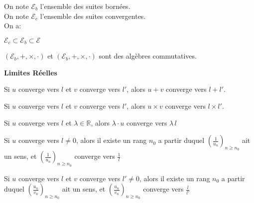 \documentclass[12pt,twoside,a4paper]{article}
\begin{document}
		\begin{prop}
			On note $\mathcal{E}_b$ l'ensemble des suites bornées.\\
			On note $\mathcal{E}_c$ l'ensemble des suites convergentes.\\
			On a:
			\begin{liste}
				\item$\mathcal{E}_c\subset\mathcal{E}_b\subset\mathcal{E}$
				\item$(\mathcal{E}_b,+,\times,\cdot)$ et $(\mathcal{E}_b,+,\times,\cdot)$ sont des algèbres commutatives.
			\end{liste}
		\end{prop}
		\begin{flushleft}
			\textbf{Limites Réelles}
		\end{flushleft}
		\begin{prop}
			\begin{liste}
				\item Si $u$ converge vers $l$ et $v$ converge vers $l'$, alors $u+v$ converge vers $l+l'$.
				\item Si $u$ converge vers $l$ et $v$ converge vers $l'$, alors $u\times v$ converge vers $l\times l'$.
				\item Si $u$ converge vers $l$ et $\lambda\in\mathbb{R}$, alors $\lambda\cdot u$ converge vers $\lambda\,l$
				\item Si $u$ converge vers $l\neq0$, alors il existe un rang $n_0$ a partir duquel $\left(\frac{1}{u_n}\right)_{n\geq n_0}$ ait un sens, et $\left(\frac{1}{u_n}\right)_{n\geq n_0}$ converge vers $\frac{1}{l}$
				\item Si $u$ converge vers $l$ et $v$ converge vers $l'\neq0$, alors il existe un rang $n_0$ a partir duquel $\left(\frac{u_n}{v_n}\right)_{n\geq n_0}$ ait un sens, et $\left(\frac{u_n}{v_n}\right)_{n\geq n_0}$ converge vers $\frac{l}{l'}$
			\end{liste}
		\end{prop}
\end{document}
